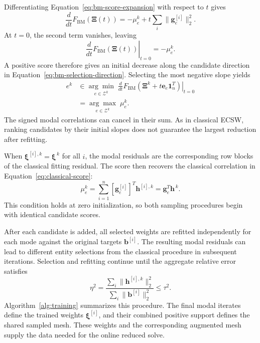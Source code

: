 \documentclass[a4paper,12pt]{article}
\newcommand{\vect}[1]{\boldsymbol{#1}}
\newcommand{\matr}[1]{\boldsymbol{#1}}
\begin{document}
Differentiating Equation~\eqref{eq:bm-score-expansion} with respect to $t$ gives
\[
 \frac{d}{dt}F_{\mathrm{BM}}(\matr{\Xi}(t))
 =-\mu_e^k+t\sum_i\|\vect{g}_e^{[i]}\|_2^2.
\]
At $t=0$, the second term vanishes, leaving
\begin{equation}
 \left.\frac{d}{dt}F_{\mathrm{BM}}(\matr{\Xi}(t))\right|_{t=0}
 =-\mu_e^k.
 \label{eq:bm-score-derivative}
\end{equation}
A positive score therefore gives an initial decrease along the candidate direction in Equation~\eqref{eq:bm-selection-direction}. Selecting the most negative slope yields
\begin{equation}
 \begin{aligned}
 e^k&\in\underset{e\in\mathcal Z^k}{\arg\min}\;
       \left.\frac{d}{dt}F_{\mathrm{BM}}
          (\matr{\Xi}^k+t\vect{e}_e\vect{1}_n^T)\right|_{t=0}\\
    &=\underset{e\in\mathcal Z^k}{\arg\max}\;\mu_e^k.
 \end{aligned}
 \label{eq:bm-selection}
\end{equation}
The signed modal correlations can cancel in their sum. As in classical ECSW, ranking candidates by their initial slopes does not guarantee the largest reduction after refitting.

When $\vect{\xi}^{[i],k}=\vect{\xi}^{\,k}$ for all $i$, the modal residuals are the corresponding row blocks of the classical fitting residual. The score then recovers the classical correlation in Equation~\eqref{eq:classical-score}:
\[
 \mu_e^k
 =\sum_{i=1}^n[\vect{g}_e^{[i]}]^T\vect{h}^{[i],k}
 =\vect{g}_e^T\vect{h}^{\,k}.
\]
This condition holds at zero initialization, so both sampling procedures begin with identical candidate scores.

After each candidate is added, all selected weights are refitted independently for each mode against the original targets $\vect{b}^{[i]}$. The resulting modal residuals can lead to different entity selections from the classical procedure in subsequent iterations. Selection and refitting continue until the aggregate relative error satisfies
\begin{equation}
 \eta^2=
 \frac{\sum_i\|\vect{h}^{[i],k}\|_2^2}
      {\sum_i\|\vect{b}^{[i]}\|_2^2}
 \leq\tau^2.
 \label{eq:training-tolerance}
\end{equation}
Algorithm~\ref{alg:training} summarizes this procedure. The final modal iterates define the trained weights $\vect{\xi}^{[i]}$, and their combined positive support defines the shared sampled mesh. These weights and the corresponding augmented mesh supply the data needed for the online reduced solve.
\end{document}

